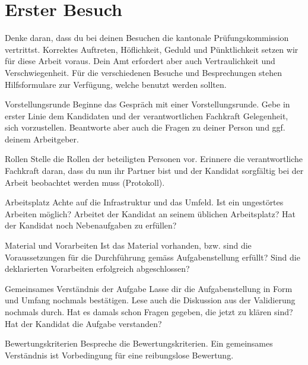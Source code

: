 \section{Erster Besuch}
Denke daran, dass du bei deinen Besuchen die kantonale Prüfungskommission vertrittst. Korrektes Auftreten, Höflichkeit, Geduld und Pünktlichkeit setzen wir für diese Arbeit voraus. Dein Amt erfordert aber auch Vertraulichkeit und Verschwiegenheit. Für die verschiedenen Besuche und Besprechungen stehen Hilfsformulare zur Verfügung, welche benutzt werden sollten.

\begin{taskitem}{Vorstellungsrunde}
  Beginne das Gespräch mit einer Vorstellungsrunde. Gebe in erster Linie dem Kandidaten und der verantwortlichen Fachkraft Gelegenheit, sich vorzustellen. Beantworte aber auch die Fragen zu deiner Person und ggf. deinem Arbeitgeber.
\end{taskitem}
\begin{taskitem}{Rollen}
  Stelle die Rollen der beteiligten Personen vor. Erinnere die verantwortliche Fachkraft daran, dass du nun ihr Partner bist und der Kandidat sorgfältig bei der Arbeit beobachtet werden muss (Protokoll).
\end{taskitem}
\begin{taskitem}{Arbeitsplatz}
  Achte auf die Infrastruktur und das Umfeld. Ist ein ungestörtes Arbeiten möglich? Arbeitet der Kandidat an seinem üblichen Arbeitsplatz? Hat der Kandidat noch Nebenaufgaben zu erfüllen?
\end{taskitem}
\begin{taskitem}{Material und Vorarbeiten}
  Ist das Material vorhanden, bzw. sind die Voraussetzungen für die Durchführung gemäss Aufgabenstellung erfüllt? Sind die deklarierten Vorarbeiten erfolgreich abgeschlossen?
\end{taskitem}
\begin{taskitem}{Gemeinsames Verständnis der Aufgabe}
  Lasse dir die Aufgabenstellung in Form und Umfang nochmals bestätigen. Lese auch die Diskussion aus der Validierung nochmals durch. Hat es damals schon Fragen gegeben, die jetzt zu klären sind? Hat der Kandidat die Aufgabe verstanden?
\end{taskitem}
\begin{taskitem}{Bewertungskriterien}
  Bespreche die Bewertungskriterien. Ein gemeinsames Verständnis ist Vorbedingung für eine reibungslose Bewertung.
\end{taskitem}
